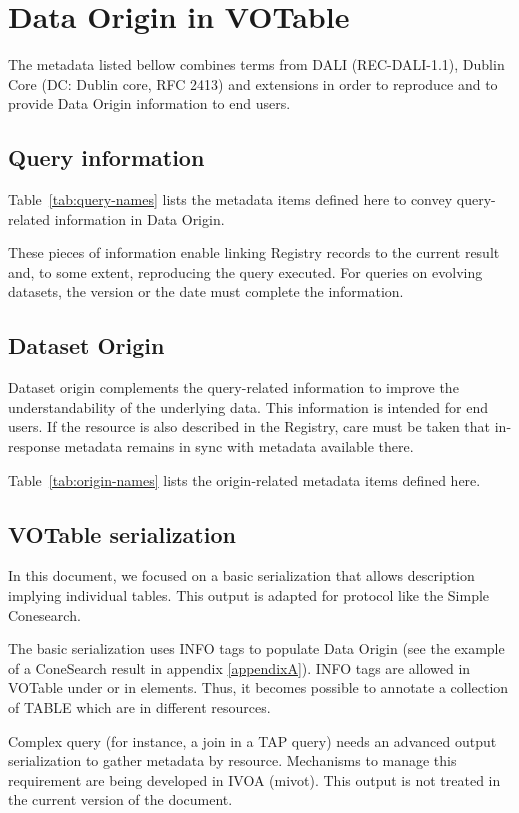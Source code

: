 \documentclass[11pt,a4paper]{ivoa}
\begin{document}
\section{Data Origin in VOTable}

The metadata listed bellow combines terms from DALI (REC-DALI-1.1), Dublin Core (DC: Dublin core, RFC 2413) and extensions in order to reproduce and to provide Data Origin information to end users.

\subsection{Query information}
Table~\ref{tab:query-names} lists the metadata items defined here to
convey query-related information in Data Origin.

These pieces of information enable linking Registry records to the
current result and, to some extent, reproducing the query executed. For
queries on evolving datasets, the version or the date must complete the
information.

\subsection{Dataset Origin}
Dataset origin complements the query-related information to improve the
understandability of the underlying data. This information is intended
for end users.  If the resource is also described in the Registry, care
must be taken that in-response metadata remains in sync with metadata
available there.


Table~\ref{tab:origin-names} lists the origin-related metadata items
defined here.


\subsection{VOTable serialization}

In this document, we focused on a basic serialization that allows description implying individual tables.
This output is adapted for protocol like the Simple Conesearch.

The basic serialization uses INFO tags to populate Data Origin (see the example of a ConeSearch result in appendix  \ref{appendixA}).
INFO tags are allowed in VOTable under  or in  elements.
Thus, it becomes possible to annotate a collection of TABLE which are in different resources.


Complex query (for instance, a join in a TAP query) needs an advanced output serialization to gather metadata by resource.
Mechanisms to manage this requirement are being developed in IVOA (mivot).
This output is not treated in the current version of the document.
\end{document}
